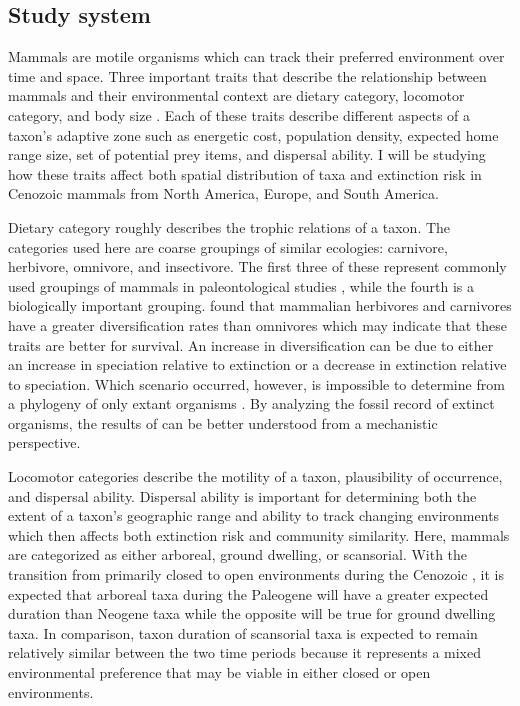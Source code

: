 \documentclass[11pt,letterpaper]{article}
\begin{document}
\subsection{Study system}
Mammals are motile organisms which can track their preferred environment over time and space. Three important traits that describe the relationship between mammals and their environmental context are dietary category, locomotor category, and body size \citep{Smith2004,Smith2008b,Damuth1981a,Damuth1979,Jernvall2004,Lyons2005,Lyons2010}. Each of these traits describe different aspects of a taxon's adaptive zone such as energetic cost, population density, expected home range size, set of potential prey items, and dispersal ability. I will be studying how these traits affect both spatial distribution of taxa and extinction risk in Cenozoic mammals from North America, Europe, and South America.

Dietary category roughly describes the trophic relations of a taxon. The categories used here are coarse groupings of similar ecologies: carnivore, herbivore, omnivore, and insectivore. The first three of these represent commonly used groupings of mammals in paleontological studies \citep{Jernvall2004,Price2012}, while the fourth is a biologically important grouping. \citet{Price2012} found that mammalian herbivores and carnivores have a greater diversification rates than omnivores which may indicate that these traits are better for survival. An increase in diversification can be due to either an increase in speciation relative to extinction or a decrease in extinction relative to speciation. Which scenario occurred, however, is impossible to determine from a phylogeny of only extant organisms \citep{Rabosky2010a}. By analyzing the fossil record of extinct organisms, the results of \citet{Price2012} can be better understood from a mechanistic perspective.

Locomotor categories describe the motility of a taxon, plausibility of occurrence, and dispersal ability. Dispersal ability is important for determining both the extent of a taxon's geographic range and ability to track changing environments \citep{Birand2012,Jablonski2006a,Gaston2009} which then affects both extinction risk and community similarity. Here, mammals are categorized as either arboreal, ground dwelling, or scansorial. With the transition from primarily closed to open environments during the Cenozoic \citep{Blois2009,Janis1993a,Stromberg2005,Stromberg2013}, it is expected that arboreal taxa during the Paleogene will have a greater expected duration than Neogene taxa while the opposite will be true for ground dwelling taxa. In comparison, taxon duration of scansorial taxa is expected to remain relatively similar between the two time periods because it represents a mixed environmental preference that may be viable in either closed or open environments. 
\end{document}
